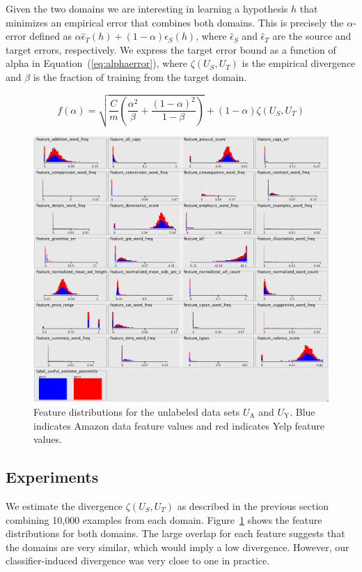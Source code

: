 \documentclass[letterpaper]{article}
\begin{document}
Given the two domains we are interesting in learning a hypothesis $h$
that minimizes an empirical error that combines both domains. This is
precisely the $\alpha$-error defined as $\alpha \hat
\epsilon_T(h)+(1-\alpha)\hat \epsilon_S(h)$, where $\hat \epsilon_S$
and $\hat \epsilon_T$ are the source and target errors,
respectively.  We express the target error bound as a function of alpha in 
Equation~(\ref{eq:alphaerror}), where $\zeta(U_S,U_T)$ is the
empirical divergence and $\beta$ is the fraction of training from the target
domain.

\begin{equation}
  \label{eq:alphaerror}
  f(\alpha)=\sqrt{\frac{C}{m}\left(\frac{\alpha^2}{\beta} + \frac{(1-\alpha)^2}{1-\beta}\right)}+(1-\alpha)\zeta(U_S,U_T)
\end{equation}

\begin{figure}[h]
	\centering
	\includegraphics[width=0.75\linewidth]{adaptation_unlabeled_features}
	\caption{Feature distributions for the unlabeled data sets $U_{\textrm{A}}$ and $U_{\textrm{Y}}$.  
	Blue indicates Amazon data feature values and red indicates Yelp feature values.}
      \label{fig:dist}
\end{figure}

\subsection{Experiments}
\label{sec:domain-adaptation}

We estimate the divergence $\zeta(U_S,U_T)$ as described in the
previous section combining 10,000 examples from each
domain. Figure~\ref{fig:dist} shows the feature distributions for both
domains. The large overlap for each feature suggests that the domains are 
very similar, which would imply a low divergence. However, our 
classifier-induced divergence was very close to one in practice.
\end{document}
